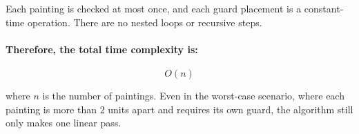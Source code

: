 \documentclass[12pt]{article}
\begin{document}
Each painting is checked at most once, and each guard placement is a constant-time operation. There are no nested loops or recursive steps.

\paragraph{Therefore, the total time complexity is:}
\[
\boxed{O(n)}
\]

where \( n \) is the number of paintings. Even in the worst-case scenario, where each painting is more than 2 units apart and requires its own guard, the algorithm still only makes one linear pass.
\end{document}
